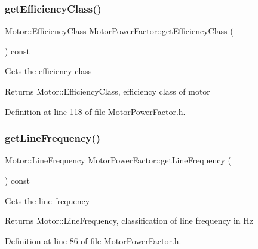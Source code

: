 \mbox{\label{class_motor_power_factor_a1ce98cb6ae9fbf09b05b4b6bd75e5c71}} 
\subsubsection{\texorpdfstring{get\+Efficiency\+Class()}{getEfficiencyClass()}}
{\footnotesize\ttfamily Motor\+::\+Efficiency\+Class Motor\+Power\+Factor\+::get\+Efficiency\+Class (\begin{DoxyParamCaption}{ }\end{DoxyParamCaption}) const\hspace{0.3cm}{\ttfamily [inline]}}

Gets the efficiency class \begin{DoxyReturn}{Returns}
Motor\+::\+Efficiency\+Class, efficiency class of motor 
\end{DoxyReturn}


Definition at line 118 of file Motor\+Power\+Factor.\+h.

\mbox{\label{class_motor_power_factor_aa4cdc420b1f611bcb9f4a69c69c1fabf}} 
\subsubsection{\texorpdfstring{get\+Line\+Frequency()}{getLineFrequency()}}
{\footnotesize\ttfamily Motor\+::\+Line\+Frequency Motor\+Power\+Factor\+::get\+Line\+Frequency (\begin{DoxyParamCaption}{ }\end{DoxyParamCaption}) const\hspace{0.3cm}{\ttfamily [inline]}}

Gets the line frequency \begin{DoxyReturn}{Returns}
Motor\+::\+Line\+Frequency, classification of line frequency in Hz 
\end{DoxyReturn}


Definition at line 86 of file Motor\+Power\+Factor.\+h.

\mbox{\label{class_motor_power_factor_acc7e144fc6c05446141cb0e07be03d70}} 
